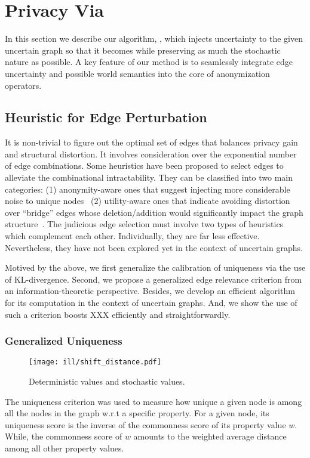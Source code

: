 \section{Privacy Via {\methodName}}
In this section we describe our algorithm, {\methodName}, which injects uncertainty to the given uncertain graph so that it becomes {\keobf} while preserving as much the stochastic nature as possible. A key feature of our method is to seamlessly integrate edge uncertainty and possible world semantics into the core of anonymization operators. 
% 
\subsection{Heuristic for Edge Perturbation}

It is non-trivial to figure out the optimal set of edges that balances privacy gain and structural distortion. 
It involves consideration over the exponential number of edge combinations. 
Some heuristics have been proposed to select edges to alleviate the combinational intractability. 
They can be classified into two main categories: (1) anonymity-aware ones that suggest injecting more considerable noise to unique nodes~\cite{Ying2009,Boldi_Injecting_2012,Hay_Anonymizing_2007} 
(2) utility-aware ones that indicate avoiding distortion over “bridge” edges whose deletion/addition would significantly impact the graph structure~\cite{Wang2011,Ninggal_Utility_2015}. 
The judicious edge selection must involve two types of heuristics which complement each other. 
Individually, they are far less effective. 
Nevertheless, they have not been explored yet in the context of uncertain graphs.

Motived by the above, we first generalize the calibration of uniqueness via the use of KL-divergence. 
Second, we propose a generalized edge relevance criterion from an information-theoretic perspective.
Besides, we develop an efficient algorithm for its computation in the context of uncertain graphs.
And, we show the use of such a criterion boosts XXX efficiently and straightforwardly.

\subsubsection{Generalized Uniqueness}

\begin{figure}
	\centering
        \texttt{[image: ill/shift\_distance.pdf]}
    \caption{Deterministic values and stochastic values.}
\end{figure}
The uniqueness criterion was used to measure how unique a given node is among all the nodes in the graph w.r.t a specific property. 
For a given node, its uniqueness score is the inverse of the commonness score of its property value $w$.
While, the commonness score of $w$ amounts to the weighted average distance among all other property values. 

